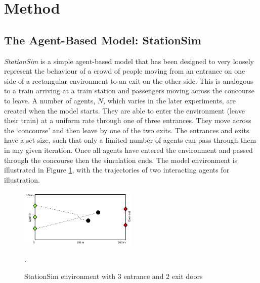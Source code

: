 \section{Method\label{method}}


\subsection{The Agent-Based Model: StationSim}

\textit{StationSim} is a simple agent-based model that has been designed to very loosely represent the behaviour of a crowd of people moving from an entrance on one side of a rectangular environment to an exit on the other side. This is analogous to a train arriving at a train station and passengers moving across the concourse to leave. A number of agents, $N$, which varies in the later experiments, are created when the model starts. They are able to enter the environment (leave their train) at a uniform rate through one of three entrances. They move across the `concourse' and then leave by one of the two exits. The entrances and exits have a set size, such that only a limited number of agents can pass through them in any given iteration. Once all agents have entered the environment and passed through the concourse then the simulation ends. The model environment is illustrated in Figure \ref{fig:StationSim}, with the trajectories of two interacting agents for illustration. 

\begin{figure}[ht]
\centering
\includegraphics[width=0.5\textwidth]{figures/PF_ABM}
\caption{StationSim environment with 3 entrance and 2 exit doors}.\label{fig:StationSim}
\end{figure}

